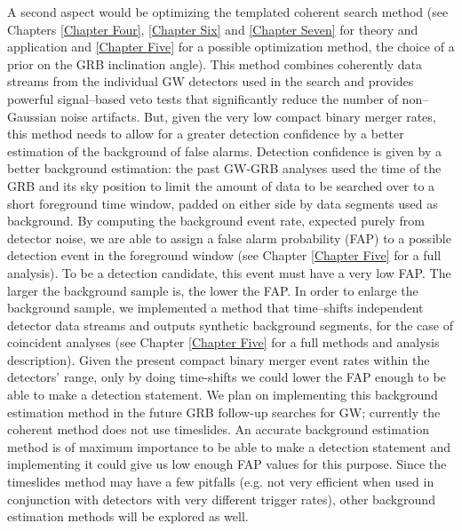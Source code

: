 A second aspect would be optimizing the templated coherent search method (see Chapters \ref{Chapter Four}, \ref{Chapter Six} and \ref{Chapter Seven} for theory and application and \ref{Chapter Five} for a possible optimization method, the choice of a prior on the GRB inclination angle). This method combines coherently data streams from the individual GW detectors used in the search and provides powerful signal--based veto tests that significantly reduce the number of non--Gaussian noise artifacts. But, given the very low compact binary merger rates, this method needs to allow for a greater detection confidence by a better estimation of the background of false alarms. Detection confidence is given by a better background estimation: the past GW-GRB analyses used the time of the GRB and its sky position to limit the amount of data to be searched over to a short foreground time window, padded on either side by data segments used as background. By computing the background event rate, expected purely from detector noise, we are able to assign a false alarm probability (FAP) to a possible detection event in the foreground window (see Chapter \ref{Chapter Five} for a full analysis). To be a detection candidate, this event must have a very low FAP. The larger the background sample is, the lower the FAP. In order to enlarge the background sample, we implemented a method that time--shifts independent detector data streams and outputs synthetic background segments, for the case of coincident analyses (see Chapter \ref{Chapter Five} for a full methods and analysis description). Given the present compact binary merger event rates within the detectors' range, only by doing time-shifts we could lower the FAP enough to be able to make a detection statement. We plan on implementing this background estimation method in the future GRB follow-up searches for GW; currently the coherent method does not use timeslides. An accurate background estimation method is of maximum importance to be able to make a detection statement and implementing it could give us low enough FAP values for this purpose. Since the timeslides method may have a few pitfalls (e.g. not very efficient when used in conjunction with detectors with very different trigger rates), other background estimation methods will be explored as well.
